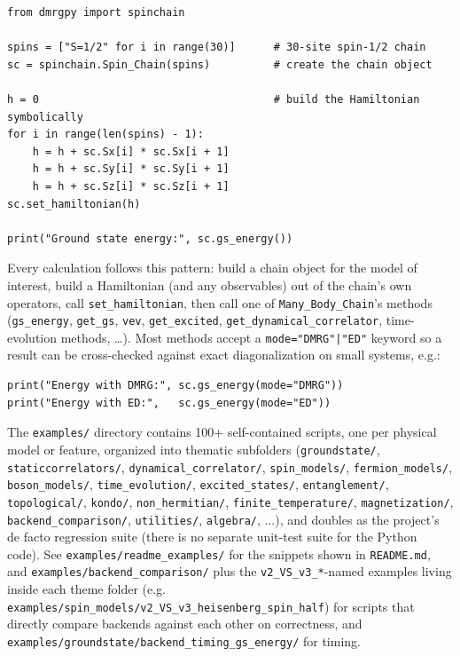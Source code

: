\documentclass[11pt]{article}
\begin{document}
\begin{lstlisting}
from dmrgpy import spinchain

spins = ["S=1/2" for i in range(30)]      # 30-site spin-1/2 chain
sc = spinchain.Spin_Chain(spins)          # create the chain object

h = 0                                     # build the Hamiltonian symbolically
for i in range(len(spins) - 1):
    h = h + sc.Sx[i] * sc.Sx[i + 1]
    h = h + sc.Sy[i] * sc.Sy[i + 1]
    h = h + sc.Sz[i] * sc.Sz[i + 1]
sc.set_hamiltonian(h)

print("Ground state energy:", sc.gs_energy())
\end{lstlisting}

Every calculation follows this pattern: build a chain object for the
model of interest, build a Hamiltonian (and any observables) out of the
chain's own operators, call \texttt{set\_hamiltonian}, then call one of
\texttt{Many\_Body\_Chain}'s methods (\texttt{gs\_energy},
\texttt{get\_gs}, \texttt{vev}, \texttt{get\_excited},
\texttt{get\_dynamical\_correlator}, time-evolution methods, \ldots).
Most methods accept a \texttt{mode="DMRG"|"ED"} keyword so a result can
be cross-checked against exact diagonalization on small systems, e.g.:

\begin{lstlisting}
print("Energy with DMRG:", sc.gs_energy(mode="DMRG"))
print("Energy with ED:",   sc.gs_energy(mode="ED"))
\end{lstlisting}

The \texttt{examples/} directory contains 100+ self-contained scripts,
one per physical model or feature, organized into thematic subfolders
(\texttt{groundstate/}, \texttt{staticcorrelators/},
\texttt{dynamical\_correlator/}, \texttt{spin\_models/},
\texttt{fermion\_models/}, \texttt{boson\_models/},
\texttt{time\_evolution/}, \texttt{excited\_states/},
\texttt{entanglement/}, \texttt{topological/}, \texttt{kondo/},
\texttt{non\_hermitian/}, \texttt{finite\_temperature/},
\texttt{magnetization/}, \texttt{backend\_comparison/},
\texttt{utilities/}, \texttt{algebra/}, ...), and doubles as the
project's de facto regression suite (there is no separate unit-test
suite for the Python code). See \texttt{examples/readme\_examples/} for
the snippets shown in \texttt{README.md}, and
\texttt{examples/backend\_comparison/} plus the \texttt{v2\_VS\_v3\_*}-named
examples living inside each theme folder (e.g.
\texttt{examples/spin\_models/v2\_VS\_v3\_heisenberg\_spin\_half}) for
scripts that directly compare backends against each other on
correctness, and \texttt{examples/groundstate/backend\_timing\_gs\_energy/}
for timing.
\end{document}
